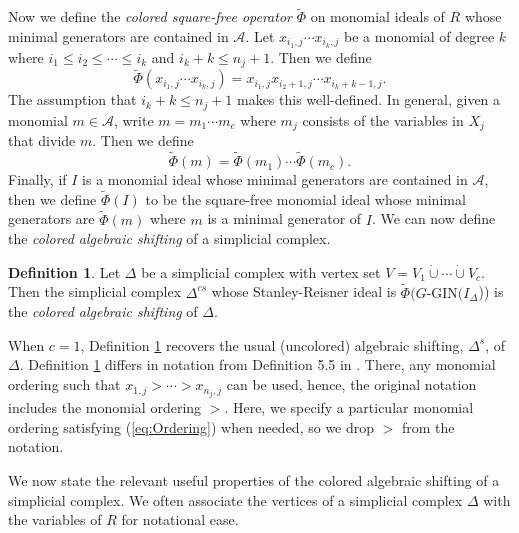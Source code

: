 \documentclass[a4paper, 10pt, reqno, english, ones]{amsart}  %
\theoremstyle{definition}
\newtheorem{definition}[theorem]{Definition}
\theoremstyle{remark}
\begin{document}
Now we define the \textit{colored square-free operator} $\tilde{\Phi}$ on monomial ideals of $R$ whose minimal generators are contained in $\mathscr{A}$. Let $x_{i_1,j}\cdots x_{i_k,j}$ be a monomial of degree $k$ where $i_1\leq i_2\leq \cdots \leq i_k$ and $i_k+k\leq n_j+1$. Then we define 
\[
\tilde{\Phi}(x_{i_1,j}\cdots x_{i_k,j})=x_{i_1,j}x_{i_2+1,j}\cdots x_{i_k+k-1,j}.
\]
The assumption that $i_k+k\leq n_j+1$ makes this well-defined. In general, given a monomial $m\in \mathscr{A}$, write $m=m_1\cdots m_c$ where $m_j$ consists of the variables in $X_j$ that divide $m$. Then we define 
\[
\tilde{\Phi}(m)=\tilde{\Phi}(m_1)\cdots \tilde{\Phi}(m_c).
\]
Finally, if $I$ is a monomial ideal whose minimal generators are contained in $\mathscr{A}$, then we define $\tilde{\Phi}(I)$ to be the square-free monomial ideal whose minimal generators are $\tilde{\Phi}(m)$ where $m$ is a minimal generator of $I$.
We can now define the \textit{colored algebraic shifting} of a simplicial complex.

\begin{definition}\label{def:algShift}
    Let $\Delta$ be a simplicial complex with vertex set $V=V_1\dot{\cup} \cdots \dot{\cup} V_c$. Then the simplicial complex $\Delta^{cs}$ whose Stanley-Reisner ideal is $\tilde{\Phi}(G\textrm{-GIN}(I_\Delta$)) is the \textit{colored algebraic shifting} of $\Delta$. 
\end{definition}

When $c=1$, Definition \ref{def:algShift} recovers the usual (uncolored) algebraic shifting, $\Delta^s$, of $\Delta$. Definition \ref{def:algShift} differs in notation from Definition 5.5 in \cite{Babson2004Face}. There, any monomial ordering such that $x_{1,j}>\cdots>x_{n_j,j}$ can be used, hence, the original notation includes the monomial ordering $>$. Here, we specify a  particular monomial ordering satisfying (\ref{eq:Ordering}) when needed, so we drop $>$ from the notation.

We now state the relevant useful properties of the colored algebraic shifting of a simplicial complex. We often associate the vertices of a simplicial complex $\Delta$ with the variables of $R$ for notational ease.
\end{document}
